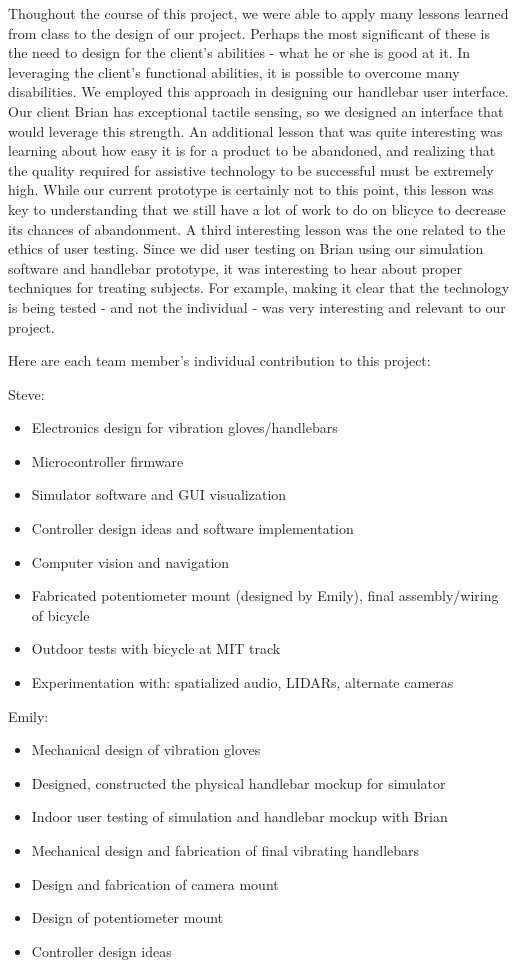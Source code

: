 \documentclass[aps,twocolumn,secnumarabic,balancelastpage,amsmath,amssymb,nofootinbib]{revtex4-1}
\begin{document}
Thoughout the course of this project, we were able to apply many lessons learned from class to the design of our project. Perhaps the most significant of these is the need to design for the client's abilities - what he or she is good at it. In leveraging the client's functional abilities, it is possible to overcome many disabilities. We employed this approach in designing our handlebar user interface. Our client Brian has exceptional tactile sensing, so we designed an interface that would leverage this strength. An additional lesson that was quite interesting was learning about how easy it is for a product to be abandoned, and realizing that the quality required for assistive technology to be successful must be extremely high. While our current prototype is certainly not to this point, this lesson was key to understanding that we still have a lot of work to do on blicyce to decrease its chances of abandonment. A third interesting lesson was the one related to the ethics of user testing. Since we did user testing on Brian using our simulation software and handlebar prototype, it was interesting to hear about proper techniques for treating subjects. For example, making it clear that the technology is being tested - and not the individual - was very interesting and relevant to our project.

Here are each team member's individual contribution to this project:

Steve:
\begin{itemize}
\item Electronics design for vibration gloves/handlebars
\item Microcontroller firmware
\item Simulator software and GUI visualization
\item Controller design ideas and software implementation
\item Computer vision and navigation 
\item Fabricated potentiometer mount (designed by Emily), final assembly/wiring of bicycle
\item Outdoor tests with bicycle at MIT track
\item Experimentation with: spatialized audio, LIDARs, alternate cameras
\end{itemize}

Emily:
\begin{itemize}
\item Mechanical design of vibration gloves
\item Designed, constructed the physical handlebar mockup for simulator
\item Indoor user testing of simulation and handlebar mockup with Brian
\item Mechanical design and fabrication of final vibrating handlebars 
\item Design and fabrication of camera mount
\item Design of potentiometer mount
\item Controller design ideas
\end{itemize}
\end{document}
